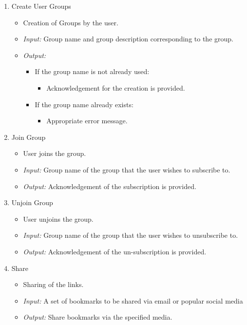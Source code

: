 \documentclass[11pt]{report} %
\begin{document}
\begin{enumerate}
	\item
		Create User Groups
		\begin{itemize}
			\item
				Creation of Groups by the user.
			\item
				\emph{Input:} Group name and group description corresponding to the group.
			\item
				\emph{Output:} 
					\begin{itemize}
						\item
							If the group name is not already used:
						\begin{itemize}
							\item
								Acknowledgement for the creation is provided.
						\end{itemize}

						\item
							If the group name already exists:
						\begin{itemize}
							\item
								Appropriate error message.
						\end{itemize}
					\end{itemize}			
			\end{itemize}

	\item
		Join Group
		\begin{itemize}
			\item
				User joins the group.
			\item
				\emph{Input:} Group name of the group that the user wishes to subscribe to.
			\item
				\emph{Output:} Acknowledgement of the subscription is provided.
		\end{itemize}

	\item
		Unjoin Group
		\begin{itemize}
			\item
				User unjoins the group.
			\item
				\emph{Input:} Group name of the group that the user wishes to unsubscribe to.
			\item
				\emph{Output:} Acknowledgement of the un-subscription is provided.
		\end{itemize}

	\item
		Share
		\begin{itemize}
			\item
				Sharing of the links.
			\item
				\emph{Input:} A set of bookmarks to be shared via email or popular social media
			\item
				\emph{Output:} Share bookmarks via the specified media.
		\end{itemize}


\end{enumerate}
\end{document}
